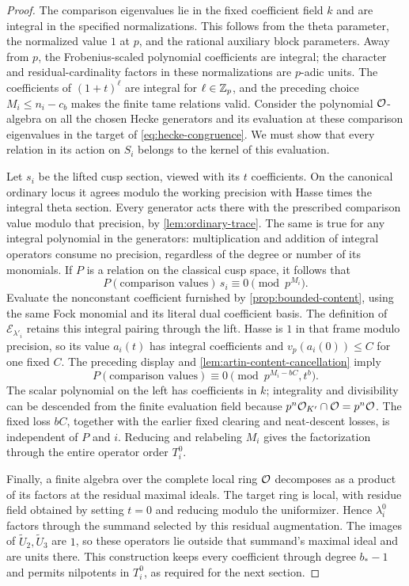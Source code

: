 \begin{proof}
The comparison eigenvalues lie in the fixed coefficient field
$k$ and are integral in the specified normalizations.  This
follows from the theta parameter, the normalized value $1$ at
$p$, and the rational auxiliary block parameters.  Away from
$p$, the Frobenius-scaled polynomial coefficients are integral;
the character and residual-cardinality factors in these
normalizations are $p$-adic units.  The coefficients of
$(1+t)^\ell$ are integral for $\ell\in\mathbb Z_p$, and the preceding
choice $M_i\leq n_i-c_b$ makes the finite tame relations valid.
Consider the
polynomial $\mathcal O$-algebra on all the chosen Hecke generators and
its evaluation at these comparison eigenvalues in the target of
\cref{eq:hecke-congruence}.  We must show that every relation
in its action on $S_i$ belongs to the kernel of this evaluation.

Let $s_i$ be the lifted cusp section, viewed with its $t$
coefficients.  On the canonical ordinary locus it agrees
modulo the working precision with Hasse times the integral
theta section.  Every generator acts there with the prescribed
comparison value modulo that precision, by
\cref{lem:ordinary-trace}.  The same is true for any integral
polynomial in the generators: multiplication and addition of
integral operators consume no precision, regardless of the
degree or number of its monomials.  If $P$ is a relation on the
classical cusp space, it follows that
\[
           P(\text{comparison values})\,s_i\equiv0
                                                   \pmod{p^{M_i}}.
\]
Evaluate the nonconstant coefficient furnished by
\cref{prop:bounded-content}, using the same Fock monomial and its
literal dual coefficient basis.  The definition of
$\mathcal E_{\lambda'_i}$ retains this integral pairing through the
lift.  Hasse is $1$ in that frame modulo precision, so its value
$a_i(t)$ has integral
coefficients and $v_p(a_i(0))\leq C$ for one fixed $C$.
The preceding display and
\cref{lem:artin-content-cancellation} imply
\[
 P(\text{comparison values})\equiv0
                                  \pmod{p^{M_i-bC},t^b}.
\]
The scalar polynomial on the left has coefficients in $k$;
integrality and divisibility can be descended from the finite
evaluation field because
$p^n\mathcal O_{K'}\cap\mathcal O=p^n\mathcal O$.
The fixed loss $bC$, together with the earlier fixed clearing
and neat-descent losses, is independent of $P$ and $i$.
Reducing and relabeling $M_i$ gives the factorization through
the entire operator order $T_i^0$.

Finally, a finite algebra over the complete local ring $\mathcal O$
decomposes as a product of its factors at the residual maximal
ideals.  The target ring is local, with residue field obtained
by setting $t=0$ and reducing modulo the uniformizer.  Hence
$\lambda_i^0$ factors through the summand selected by this
residual augmentation.  The images of
$\widetilde U_2,\widetilde U_3$ are $1$, so these operators
lie outside that summand's maximal ideal and are units there.
This construction keeps every coefficient through degree
$b_*-1$ and permits nilpotents in $T_i^0$, as required for the
next section.
\end{proof}
